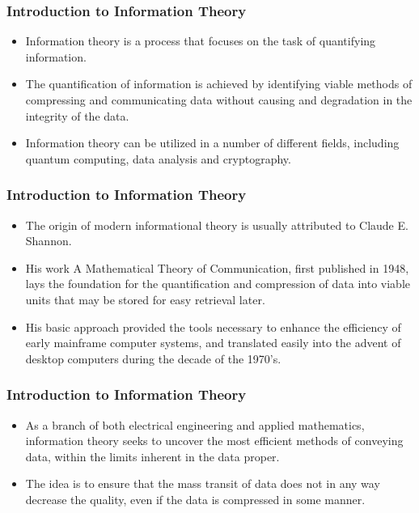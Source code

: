 \documentclass[a4]{beamer}
\begin{document}
\begin{frame}
\frametitle{Introduction to Information Theory}
\begin{itemize}
\item Information theory is a process that focuses on the task of quantifying information. 
\item The quantification of information is achieved by identifying viable methods of compressing and communicating data without causing 
and degradation in the integrity of the data. 
\item Information theory can be utilized in a number of different fields, including quantum computing, 
data analysis and cryptography.
\end{itemize}
\end{frame}
\begin{frame}
\frametitle{Introduction to Information Theory}
\begin{itemize}
\item The origin of modern informational theory is usually attributed to Claude E. Shannon.
\item His work A Mathematical Theory of Communication, first published in 1948, 
lays the foundation for the quantification and compression of data into viable units that may be stored for easy retrieval later. 
\item His basic approach provided the tools necessary to enhance the efficiency of early mainframe computer systems, and translated easily into 
the advent of desktop computers during the decade of the 1970’s.
\end{itemize}
\end{frame}
\begin{frame}
\frametitle{Introduction to Information Theory}
\begin{itemize}

\item As a branch of both electrical engineering and applied mathematics, information theory seeks to uncover the most efficient 
methods of conveying data, within the limits inherent in the data proper. \item The idea is to ensure that the mass transit of data does 
not in any way decrease the quality, even if the data is compressed in some manner. 
\end{itemize}
\end{frame}
\end{document}
